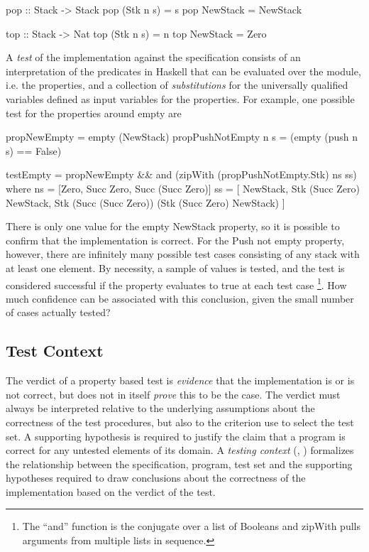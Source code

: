{\begin{code}
pop ::  Stack -> Stack
pop (Stk n s) = s
pop NewStack = NewStack

top :: Stack -> Nat
top (Stk n s) = n
top NewStack = Zero

\end{code}

A \emph{test} of the implementation against the specification 
consists of an interpretation of the predicates in Haskell 
that can be evaluated over the module, i.e. the properties,
and a collection of \emph{substitutions} for
the universally qualified variables defined as input variables
for the properties.
For example, one possible test for the properties around empty are

\begin{code}
propNewEmpty = empty (NewStack)
propPushNotEmpty n s  = (empty (push n s) == False)

testEmpty = propNewEmpty
    && and (zipWith (propPushNotEmpty.Stk) ns ss)
    where ns = [Zero, Succ Zero, Succ (Succ Zero)]
                 ss = [ NewStack, Stk (Succ Zero) NewStack, Stk (Succ (Succ Zero)) (Stk (Succ Zero) NewStack) ]
                 
\end{code}

\noindent There is only one value for the empty NewStack property,
so it is possible to confirm that the implementation is correct.
For the Push not empty property, however,
there are infinitely many possible test cases consisting of 
any stack with at least one element.
By necessity, a sample of values is tested,
and the test is considered successful if
the property evaluates to true at each test case
\footnote{The ``and'' function is the conjugate over a list of Booleans
and zipWith pulls arguments from multiple lists in sequence.}.
How much confidence can be associated with this conclusion,
given the small number of cases actually tested?

\subsection{ Test Context }\label{sub:context}

The verdict of a property based test
is \emph{evidence} that the implementation is or is not correct,
but does not in itself \emph{prove} this to be the case.
The verdict must always be interpreted relative to
the underlying assumptions about the correctness of the test procedures,
but also to the criterion use to select the test set.
A supporting hypothesis is required to justify 
the claim that a program is correct for any untested elements of its domain.
A \emph{testing context} (\cite{BernotGaudelMarre1991}, \cite{Bernot1991})
formalizes the relationship between
the specification, program, test set and the supporting hypotheses required
to draw conclusions about the correctness of the implementation
based on the verdict of the test.

}
